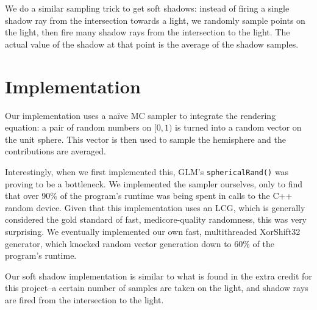 \documentclass{article}
\begin{document}
We do a similar sampling trick to get soft shadows: instead of firing
a single shadow ray from the intersection towards a light, we randomly sample
points on the light, then fire many shadow rays from the intersection to the 
light. The actual value of the shadow at that point is the average of the
shadow samples.

\section{Implementation}

Our implementation uses a na\"ive MC sampler to integrate the rendering 
equation: a pair of random numbers on $[0,1)$ is turned into a random vector
on the unit sphere. This vector is then used to sample the hemisphere
and the contributions are averaged.

Interestingly, when we first implemented this, GLM's \texttt{sphericalRand()}
was proving to be a bottleneck. We implemented the sampler ourselves, only to
find that over 90\% of the program's runtime was being spent in calls to the
C++ random device. Given that this implementation uses an LCG, which is
generally considered the gold standard of fast, medicore-quality randomness,
this was very surprising. We eventually implemented our own fast, multithreaded
XorShift32 generator, which knocked random vector generation down to 60\% of
the program's runtime.

Our soft shadow implementation is similar to what is found in the extra credit
for this project--a certain number of samples are taken on the light, and shadow
rays are fired from the intersection to the light.
\end{document}
